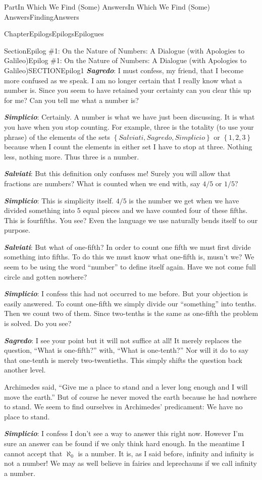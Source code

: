 \documentclass[oneside,10pt,]{book}
\newcommand{\alert}[1]{\textbf{\textit{#1}}}
\numberwithin{equation}{part}
\begin{document}
\begin{partptx}{Part}{In Which We Find (Some) Answers}{}{In Which We Find (Some) Answers}{}{}{FindingAnswers}
\begin{chapterptx}{Chapter}{Epilogs}{}{Epilogs}{}{}{Epilogues}
\begin{sectionptx}{Section}{Epilog \#1: On the Nature of Numbers: A Dialogue (with Apologies to Galileo)}{}{Epilog \#1: On the Nature of Numbers: A Dialogue (with Apologies to Galileo)}{}{}{SECTIONEpilog1}
\alert{Sagredo}:  I must confess, my friend, that I become more confused as we speak. I am no longer certain that I really know what a number is. Since you seem to have retained your certainty can you clear this up for me? Can you tell me what a number is?%
\par
\alert{Simplicio}:  Certainly. A number is what we have just been discussing. It is what you have when you stop counting. For example, three is the totality (to use your phrase) of the elements of the sets \(\left\{Salviati, Sagredo, Simplicio\right\}\) or \(\left\{1, 2, 3\right\}\) because when I count the elements in either set I have to stop at three. Nothing less, nothing more. Thus three is a number.%
\par
\alert{Salviati}:  But this definition only confuses me! Surely you will allow that fractions are numbers? What is counted when we end with, say \(4/5\) or \(1/5?\)%
\par
\alert{Simplicio}: This is simplicity itself.  \(4/5\) is the number we get when we have divided something into \(5\) equal pieces and we have counted four of these fifths.  This is four\textendash{}fifths.  You see?  Even the language we use naturally bends itself to our purpose.%
\par
\alert{Salviati}:  But what of one-fifth? In order to count one fifth we must first divide something into fifths. To do this we must know what one-fifth is, musn't we? We seem to be using the word ``number'' to define itself again. Have we not come full circle and gotten nowhere?%
\par
\alert{Simplicio}:  I confess this had not occurred to me before. But your objection is easily answered. To count one-fifth we simply divide our ``something'' into tenths. Then we count two of them. Since two-tenths is the same as one-fifth the problem is solved. Do you see?%
\par
\alert{Sagredo}:  I see your point but it will not suffice at all! It merely replaces the question, ``What is one-fifth?'' with, ``What is one-tenth?'' Nor will it do to say that one-tenth is merely two-twentieths. This simply shifts the question back another level.%
\par
Archimedes said, ``Give me a place to stand and a lever long enough and I will move the earth.'' But of course he never moved the earth because he had nowhere to stand. We seem to find ourselves in Archimedes' predicament: We have no place to stand.%
\par
\alert{Simplicio}:  I confess I don't see a way to answer this right now. However I'm sure an answer can be found if we only think hard enough. In the meantime I cannot accept that \(\aleph_0\) is a number. It is, as I said before, infinity and infinity is not a number! We may as well believe in fairies and leprechauns if we call infinity a number.%

\end{sectionptx}
\end{chapterptx}
\end{partptx}
\end{document}
